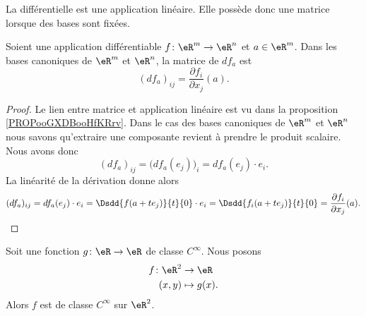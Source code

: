 La différentielle est une application linéaire. Elle possède donc une matrice lorsque des bases sont fixées.
\begin{proposition}     \label{PROPooBMROooThgLuU}
	Soient une application différentiable \( f\colon \eR^m\to \eR^n\) et \( a\in \eR^m\). Dans les bases canoniques de \( \eR^m\) et \( \eR^n\), la matrice de \( df_a\) est
	\begin{equation}
		(df_a)_{ij}=\frac{ \partial f_i }{ \partial x_j }(a).
	\end{equation}
\end{proposition}

\begin{proof}
	Le lien entre matrice et application linéaire est vu dans la proposition \ref{PROPooGXDBooHfKRrv}. Dans le cas des bases canoniques de \( \eR^m\) et \( \eR^n\) nous savons qu'extraire une composante revient à prendre le produit scalaire. Nous avons donc
	\begin{equation}
		(df_a)_{ij}=\big( df_a(e_j) \big)_i=df_a(e_j)\cdot e_i.
	\end{equation}
	La linéarité de la dérivation donne alors
	\begin{equation}
		(df_a)_{ij}=df_a(e_j)\cdot e_i=\Dsdd{ f(a+te_j) }{t}{0}\cdot e_i=\Dsdd{ f_i(a+te_j) }{t}{0}=\frac{ \partial f_i }{ \partial x_j }(a).
	\end{equation}
\end{proof}


\begin{lemma}       \label{LEMooDDUZooLwXkRp}
	Soit une fonction \( g\colon \eR\to \eR\) de classe \(  C^{\infty}\). Nous posons
	\begin{equation}
		\begin{aligned}
			f\colon \eR^2 & \to \eR       \\
			(x,y)         & \mapsto g(x).
		\end{aligned}
	\end{equation}
	Alors \( f\) est de classe \(  C^{\infty}\) sur \( \eR^2\).
\end{lemma}

